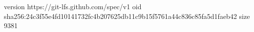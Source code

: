 version https://git-lfs.github.com/spec/v1
oid sha256:24c3f55e4fd10141732fc4b207625db11c9b15f5761a44c836c85fa5d1faeb42
size 9381
